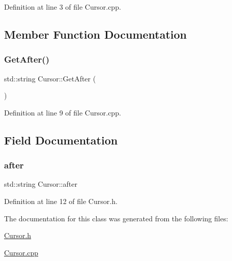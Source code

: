 Definition at line 3 of file Cursor.\+cpp.



\subsection{Member Function Documentation}
\mbox{\label{class_cursor_aeeaeb893dc965470605484337aba8f23}} 
\subsubsection{\texorpdfstring{Get\+After()}{GetAfter()}}
{\footnotesize\ttfamily std\+::string Cursor\+::\+Get\+After (\begin{DoxyParamCaption}{ }\end{DoxyParamCaption})}



Definition at line 9 of file Cursor.\+cpp.



\subsection{Field Documentation}
\mbox{\label{class_cursor_a0428610a0f936e0cc244ef330742fd49}} 
\subsubsection{\texorpdfstring{after}{after}}
{\footnotesize\ttfamily std\+::string Cursor\+::after\hspace{0.3cm}{\ttfamily [private]}}



Definition at line 12 of file Cursor.\+h.



The documentation for this class was generated from the following files\+:\begin{DoxyCompactItemize}
\item 
\mbox{\hyperlink{_cursor_8h}{Cursor.\+h}}\item 
\mbox{\hyperlink{_cursor_8cpp}{Cursor.\+cpp}}\end{DoxyCompactItemize}
